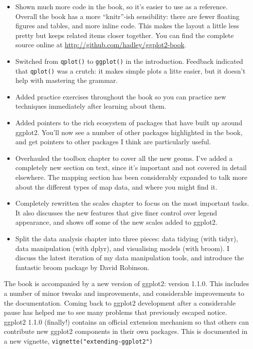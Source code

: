 \begin{itemize}
\item
  Shown much more code in the book, so it's easier to use as a
  reference. Overall the book has a more ``knitr''-ish sensibility:
  there are fewer floating figures and tables, and more inline code.
  This makes the layout a little less pretty but keeps related items
  closer together. You can find the complete source online at
  \url{http://github.com/hadley/ggplot2-book}.
\item
  Switched from \texttt{qplot()} to \texttt{ggplot()} in the
  introduction. Feedback indicated that \texttt{qplot()} was a crutch:
  it makes simple plots a litte easier, but it doesn't help with
  mastering the grammar.
\item
  Added practice exercises throughout the book so you can practice new
  techniques immediately after learning about them.
\item
  Added pointers to the rich ecosystem of packages that have built up
  around ggplot2. You'll now see a number of other packages highlighted
  in the book, and get pointers to other packages I think are
  particularly useful.
\item
  Overhauled the toolbox chapter to cover all the new geoms. I've added
  a completely new section on text, since it's important and not covered
  in detail elsewhere. The mapping section has been considerably
  expanded to talk more about the different types of map data, and where
  you might find it.
\item
  Completely rewritten the scales chapter to focus on the most important
  tasks. It also discusses the new features that give finer control over
  legend appearance, and shows off some of the new scales added to
  ggplot2.
\item
  Split the data analysis chapter into three pieces: data tidying (with
  tidyr), data manipulation (with dplyr), and visualising models (with
  broom). I discuss the latest iteration of my data manipulation tools,
  and introduce the fantastic broom package by David Robinson.
\end{itemize}

The book is accompanied by a new version of ggplot2: version 1.1.0. This
includes a number of minor tweaks and improvements, and considerable
improvements to the documentation. Coming back to ggplot2 development
after a considerable pause has helped me to see many problems that
previously escaped notice. ggplot2 1.1.0 (finally!) contains an official
extension mechanism so that others can contribute new ggplot2 components
in their own packages. This is documented in a new vignette,
\texttt{vignette("extending-ggplot2")}


